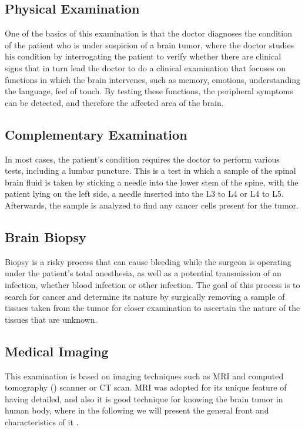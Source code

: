 \subsection{Physical Examination}
One of the basics of this examination is that the doctor diagnoses the condition of the patient who is under suspicion of a brain tumor, where the doctor studies his condition by interrogating the patient to verify whether there are clinical signs that in turn lead the doctor to do a clinical examination that focuses on functions in which the brain intervenes, such as memory, emotions, understanding the language, feel of touch. By testing these functions, the peripheral symptoms can be detected, and therefore the affected area of the brain.

\subsection{Complementary Examination}
In most cases, the patient's condition requires the doctor to perform various tests, including a lumbar puncture. This is a test in which a sample of the spinal brain fluid is taken by sticking a needle into the lower stem of the spine, with the patient lying on the left side, a needle inserted into the L3 to L4 or L4 to L5. Afterwards, the sample is analyzed to find any cancer cells present for the tumor.

\subsection{Brain Biopsy}
Biopsy is a risky process that can cause bleeding while the surgeon is operating under the patient's total anesthesia, as well as a potential transmission of an infection, whether blood infection or other infection. The goal of this process is to search for cancer and determine its nature by surgically removing a sample of tissues taken from the tumor for closer examination to ascertain the nature of the tissues that are unknown.

\subsection{Medical Imaging}
This examination is based on imaging techniques such as MRI and computed tomography () scanner or CT scan. MRI was adopted for its unique feature of having detailed, and also it is good technique for knowing the brain tumor in human body, where in the following we will present the general front and characteristics of it \cite{ref10}.

